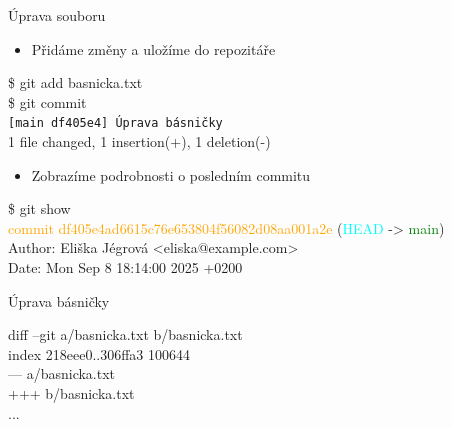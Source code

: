 \documentclass{beamer}
\begin{document}
\begin{frame}[fragile]{Úprava souboru}
	
	\begin{itemize}
		\item Přidáme změny a uložíme do repozitáře
	\end{itemize}
	
	{\ttfamily\small
		\$ git add basnicka.txt \\
		\$ git commit \\
		\texttt{[main df405e4] Úprava básničky} \\
		1 file changed, 1 insertion(+), 1 deletion(-)
	}
	
	\hspace{0.5cm}
	\begin{itemize}
		\item Zobrazíme podrobnosti o posledním commitu
	\end{itemize}
	
	{\ttfamily\small
		\$ git show \\
\textcolor{orange}{commit} \textcolor{orange}{df405e4ad6615c76e653804f56082d08aa001a2e} (\textcolor{cyan}{HEAD} -> \textcolor{green}{main}) \\

		Author: Eliška Jégrová <eliska@example.com> \\
		Date:   Mon Sep 8 18:14:00 2025 +0200
		
		Úprava básničky

		diff --git a/basnicka.txt b/basnicka.txt \\
		index 218eee0..306ffa3 100644 \\
		--- a/basnicka.txt \\
		+++ b/basnicka.txt \\
		...
	}
	
\end{frame}
\end{document}

